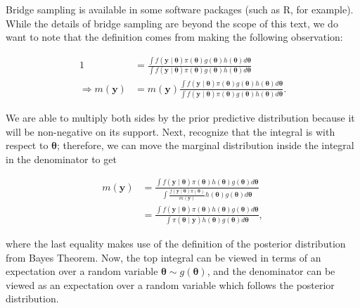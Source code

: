 \documentclass[
  letterpaper,
  DIV=11,
  numbers=noendperiod]{scrreprt}
\theoremstyle{definition}
\theoremstyle{plain}
\theoremstyle{definition}
\theoremstyle{remark}
\begin{document}
Bridge sampling is available in some software packages (such as R, for
example). While the details of bridge sampling are beyond the scope of
this text, we do want to note that the definition comes from making the
following observation:

\[
\begin{aligned}
  1 &= \frac{\int f(\mathbf{y} \mid \boldsymbol{\theta}) \pi(\boldsymbol{\theta}) g(\boldsymbol{\theta}) h(\boldsymbol{\theta})d\boldsymbol{\theta}}{\int f(\mathbf{y} \mid \boldsymbol{\theta}) \pi(\boldsymbol{\theta}) g(\boldsymbol{\theta}) h(\boldsymbol{\theta})d\boldsymbol{\theta}} \\
  \Rightarrow m(\mathbf{y}) &= m(\mathbf{y}) \frac{\int f(\mathbf{y} \mid \boldsymbol{\theta}) \pi(\boldsymbol{\theta}) g(\boldsymbol{\theta}) h(\boldsymbol{\theta})d\boldsymbol{\theta}}{\int f(\mathbf{y} \mid \boldsymbol{\theta}) \pi(\boldsymbol{\theta}) g(\boldsymbol{\theta}) h(\boldsymbol{\theta})d\boldsymbol{\theta}}. 
\end{aligned}
\]

We are able to multiply both sides by the prior predictive distribution
because it will be non-negative on its support. Next, recognize that the
integral is with respect to \(\boldsymbol{\theta}\); therefore, we can
move the marginal distribution inside the integral in the denominator to
get

\[
\begin{aligned}
  m(\mathbf{y}) &= \frac{\int f(\mathbf{y} \mid \boldsymbol{\theta}) \pi(\boldsymbol{\theta}) h(\boldsymbol{\theta}) g(\boldsymbol{\theta})d\boldsymbol{\theta}}{\int \frac{f(\mathbf{y} \mid \boldsymbol{\theta}) \pi(\boldsymbol{\theta})}{m(\mathbf{y})} h(\boldsymbol{\theta}) g(\boldsymbol{\theta})d\boldsymbol{\theta}} \\
    &= \frac{\int f(\mathbf{y} \mid \boldsymbol{\theta}) \pi(\boldsymbol{\theta}) h(\boldsymbol{\theta}) g(\boldsymbol{\theta})d\boldsymbol{\theta}}{\int \pi(\boldsymbol{\theta} \mid \mathbf{y}) h(\boldsymbol{\theta}) g(\boldsymbol{\theta})d\boldsymbol{\theta}},
\end{aligned}
\]

where the last equality makes use of the definition of the posterior
distribution from Bayes Theorem. Now, the top integral can be viewed in
terms of an expectation over a random variable
\(\boldsymbol{\theta} \sim g(\boldsymbol{\theta})\), and the denominator
can be viewed as an expectation over a random variable which follows the
posterior distribution.
\end{document}
